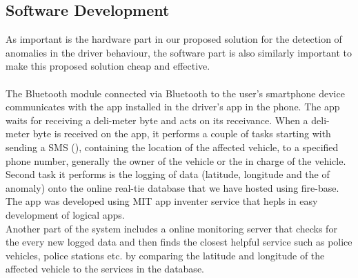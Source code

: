 \documentclass[12pt]{article}
\begin{document}
\subsection{Software Development}
As important is the hardware part in our proposed solution for the detection of anomalies in the driver behaviour, the software part is also similarly important to make this proposed solution cheap and effective. \\ \\ 
The Bluetooth module connected via Bluetooth to the user's smartphone device communicates with the app installed in the driver's app in the phone. The app waits for receiving a deli-meter byte and acts on its receivance. When a deli-meter byte is received on the app, it performs a couple of tasks starting with sending a SMS (), containing the location of the affected vehicle, to a specified phone number, generally the owner of the vehicle or the in charge of the vehicle.
\\
Second task it performs is the logging of data (latitude, longitude and the of anomaly) onto the online real-tie database that we have hosted using fire-base. The app was developed using MIT app inventer service that hepls in easy development of logical apps. 
\\
Another part of the system includes a online monitoring server that checks for the every new logged data and then finds the closest helpful service such as police vehicles, police stations etc. by comparing the latitude and longitude of the affected vehicle to the services in the database.

\end{document}
